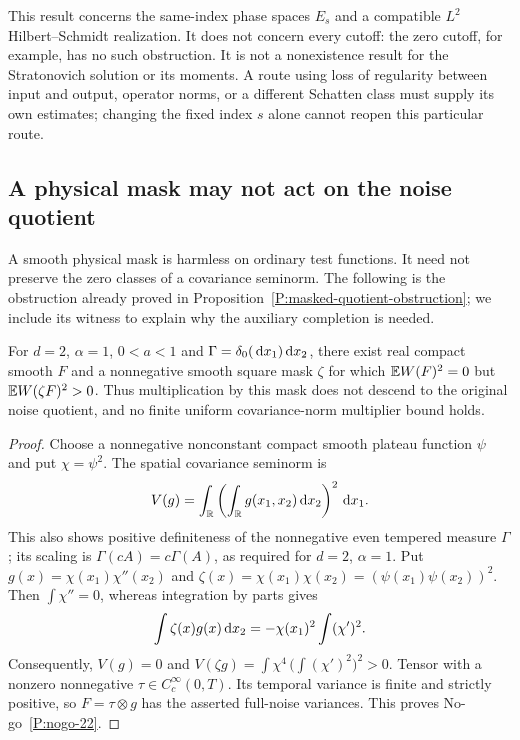 This result concerns the same-index phase spaces $E_s$ and a compatible
$L^2$ Hilbert--Schmidt realization. It does not concern every cutoff: the zero
cutoff, for example, has no such obstruction. It is not a nonexistence result
for the Stratonovich solution or its moments. A route using loss of regularity
between input and output, operator norms, or a different Schatten class must
supply its own estimates; changing the fixed index $s$ alone cannot reopen
this particular route.

\subsection{A physical mask may not act on the noise quotient}
\label{S:nogo-22}

A smooth physical mask is harmless on ordinary test functions. It need not
preserve the zero classes of a covariance seminorm. The following is the
obstruction already proved in Proposition~\ref{P:masked-quotient-obstruction};
we include its witness to explain why the auxiliary completion is needed.

\setcounter{nogo}{21}
\begin{nogo}
  \label{P:nogo-22}
  For $d=2$, $\alpha=1$, $0<a<1$ and
  $\Gamma=\delta_0(\,\mathrm{d} x_1)\,\mathrm{d} x_2$, there exist real compact smooth $F$ and
  a nonnegative smooth square mask $\zeta$ for which
  $\mathbb{E} W(F)^2=0$ but $\mathbb{E} W(\zeta F)^2>0$.
  Thus multiplication by this mask does not descend to the original noise
  quotient, and no finite uniform covariance-norm multiplier bound holds.
\end{nogo}
\begin{proof}
  Choose a nonnegative nonconstant compact smooth plateau function $\psi$ and
  put $\chi=\psi^2$. The spatial covariance seminorm is
  \[
    V(g)=\int_{\mathbb{R}}\left(\int_{\mathbb{R}} g(x_1,x_2)\,\mathrm{d} x_2\right)^2\,\mathrm{d} x_1.
  \]
  This also shows positive definiteness of the nonnegative even tempered
  measure $\Gamma$; its scaling is $\Gamma(cA)=c\Gamma(A)$, as required
  for $d=2$, $\alpha=1$. Put
  $g(x)=\chi(x_1)\chi''(x_2)$ and
  $\zeta(x)=\chi(x_1)\chi(x_2)=(\psi(x_1)\psi(x_2))^2$.
  Then $\int\chi''=0$, whereas integration by parts gives
  \[
    \int\zeta(x)g(x)\,\mathrm{d} x_2=-\chi(x_1)^2\int(\chi')^2.
  \]
  Consequently, $V(g)=0$ and
  $V(\zeta g)=\int\chi^4\,\big(\int(\chi')^2\big)^2>0$.
  Tensor with a nonzero nonnegative $\tau\in C_c^\infty(0,T)$. Its temporal
  variance is finite and strictly positive, so $F=\tau\otimes g$ has the
  asserted full-noise variances. This proves No-go~\ref{P:nogo-22}.
\end{proof}

